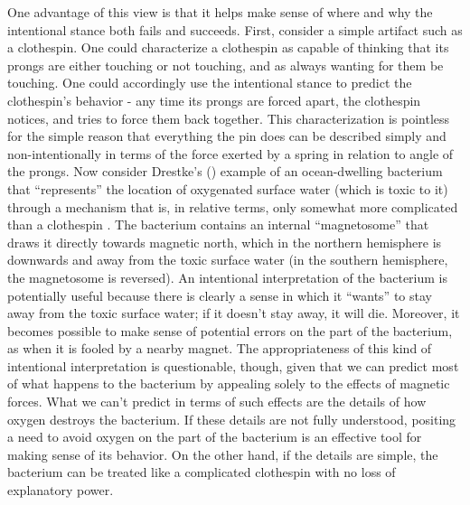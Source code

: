 One advantage of this view is that it helps make sense of where and why the intentional stance both fails and succeeds. First, consider a simple artifact such as a clothespin. One could characterize a clothespin as capable of thinking that its prongs are either touching or not touching, and as always wanting for them be touching. One could accordingly use the intentional stance to predict the clothespin's behavior - any time its prongs are forced apart, the clothespin notices, and tries to force them back together. This characterization is pointless for the simple reason that everything the pin does can be described simply and non-intentionally in terms of the force exerted by a spring in relation to angle of the prongs. Now consider Drestke's (\citeyear{Dretske:1986}) example of an ocean-dwelling bacterium that ``represents'' the location of oxygenated surface water (which is toxic to it) through a mechanism that is, in relative terms, only somewhat more complicated than a clothespin \citep[cf.][p. 290-91]{Millikan:1989}. The bacterium contains an internal ``magnetosome'' that draws it directly towards magnetic north, which in the northern hemisphere is downwards and away from the toxic surface water (in the southern hemisphere, the magnetosome is reversed). An intentional interpretation of the bacterium is potentially useful because there is clearly a sense in which it ``wants'' to stay away from the toxic surface water; if it doesn't stay away, it will die. Moreover, it becomes possible to make sense of potential errors on the part of the bacterium, as when it is fooled by a nearby magnet. The appropriateness of this kind of intentional interpretation is questionable, though, given that we can predict most of what happens to the bacterium by appealing solely to the effects of magnetic forces. What we can't predict in terms of such effects are the details of how oxygen destroys the bacterium. If these details are not fully understood, positing a need to avoid oxygen on the part of the bacterium is an effective tool for making sense of its behavior. On the other hand, if the details are simple, the bacterium can be treated like a complicated clothespin with no loss of explanatory power. 

